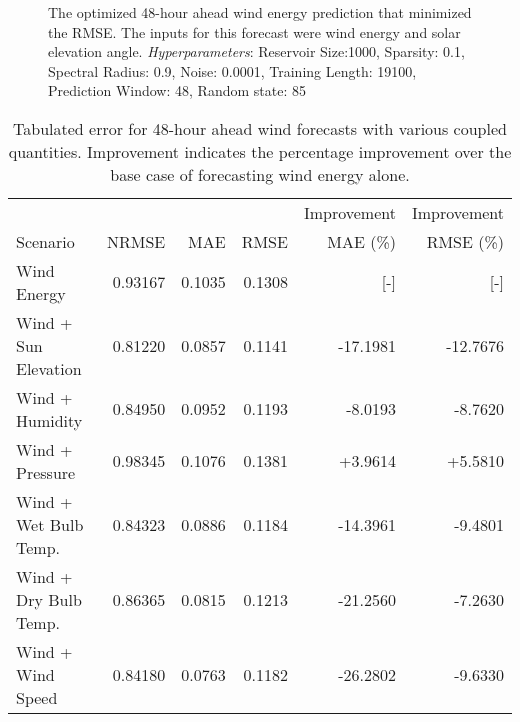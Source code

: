 \begin{figure*}[h]
  \centering
  
  \caption{The optimized 48-hour ahead wind energy prediction that minimized
  the RMSE. The inputs for this forecast were wind energy and solar elevation
  angle. \textit{Hyperparameters}: Reservoir Size:1000, Sparsity: 0.1, Spectral
  Radius: 0.9, Noise: 0.0001, Training Length: 19100, Prediction Window: 48,
  Random state: 85}
  \label{fig:wind48}
\end{figure*}
  \begin{table*}[h]
    \centering
    \caption{Tabulated error for 48-hour ahead wind forecasts with various coupled quantities. Improvement indicates the percentage improvement over the base case of forecasting wind energy alone.}
    \label{tab:wind48}
    \begin{tabular}{l|r|r|r|r|r}
      & & & & Improvement & Improvement \\
      Scenario &NRMSE & MAE & RMSE & MAE (\%) & RMSE (\%)\\
      \hline
      Wind Energy & 0.93167 & 0.1035 & 0.1308 & [-] & [-] \\
      Wind + Sun Elevation & 0.81220 & 0.0857 & 0.1141 & -17.1981 & -12.7676 \\
      Wind + Humidity & 0.84950 & 0.0952 & 0.1193 & -8.0193 & -8.7620 \\
      Wind + Pressure & 0.98345 & 0.1076 & 0.1381 & +3.9614 & +5.5810 \\
      Wind + Wet Bulb Temp. & 0.84323 & 0.0886 & 0.1184 & -14.3961 & -9.4801 \\
      Wind + Dry Bulb Temp. & 0.86365 & 0.0815 & 0.1213 & -21.2560 & -7.2630 \\
      Wind + Wind Speed & 0.84180 & 0.0763 & 0.1182 & -26.2802 & -9.6330 \\
    \end{tabular}
  \end{table*}
